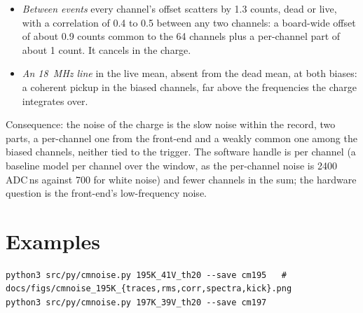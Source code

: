 \documentclass[11pt]{article}
\begin{document}
\begin{itemize}
  spectra identical. The baseline scatter that fell as the square root
  of the trigger rate (47 counts at 41~V to 5.6 at 39~V) compared a pass
  with the dead-channel common mode to passes with the interpolated
  median: with the same method the pass files give 47 and 29 (clipped
  32 and 28), and this script 44 and 48 on clean events.
\item \emph{Between events} every channel's offset scatters by 1.3
  counts, dead or live, with a correlation of 0.4 to 0.5 between any two
  channels: a board-wide offset of about 0.9 counts common to the 64
  channels plus a per-channel part of about 1 count. It cancels in the
  charge.
\item \emph{An 18~MHz line} in the live mean, absent from the dead
  mean, at both biases: a coherent pickup in the biased channels, far
  above the frequencies the charge integrates over.
\end{itemize}

Consequence: the noise of the charge is the slow noise within the
record, two parts, a per-channel one from the front-end and a weakly
common one among the biased channels, neither tied to the trigger. The
software handle is per channel (a baseline model per channel over the
window, as the per-channel noise is 2400 ADC\,ns against 700 for white
noise) and fewer channels in the sum; the hardware question is the
front-end's low-frequency noise.

\section{Examples}

\begin{lstlisting}
python3 src/py/cmnoise.py 195K_41V_th20 --save cm195   # docs/figs/cmnoise_195K_{traces,rms,corr,spectra,kick}.png
python3 src/py/cmnoise.py 197K_39V_th20 --save cm197
\end{lstlisting}
\end{document}
